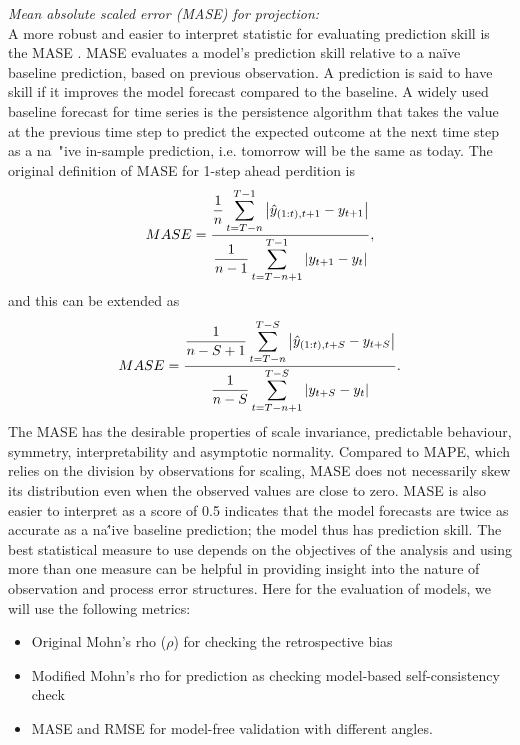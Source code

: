 \vspace{0.2cm} \noindent
{\it Mean absolute scaled error (MASE) for projection:}\\ 
A more robust and easier to interpret statistic for evaluating prediction skill is the MASE \citep{hyndman2006another}. MASE evaluates a model's prediction skill relative to a na\" {i}ve baseline prediction, based on previous observation. A prediction is said to have skill if it improves the model forecast compared to the baseline. A widely used baseline forecast for time series is the persistence algorithm that takes the value at the previous time step to predict the expected outcome at the next time step as a na\ "{i}ve in-sample prediction, i.e. tomorrow will be the same as today. The original definition of MASE for 1-step ahead perdition is 
\begin{equation}
{MASE=\frac{\displaystyle\frac{1}{n} \sum_{t=T-n}^{T-1} \left| \hat{y}_{(1:t),t+1}-y_{t+1} \right|}
{\displaystyle\frac{1}{n-1} \sum_{t=T-n+1}^{T-1} \left|y_{t+1}-y_{t}\right|}}, 
\end{equation}
and this can be extended as 
\begin{equation}
MASE=
\frac{\displaystyle \frac{1}{n-S+1} \sum_{t=T-n}^{T-S}  \left| \hat{y}_{(1:t),t+S}-y_{t+S} \right|}
{\displaystyle \frac{1}{n-S} \sum_{t=T-n+1}^{T-S} \left|y_{t+S}-y_{t}\right|}. 
\end{equation} 
The MASE has the desirable properties of scale invariance, predictable behaviour, symmetry, interpretability and asymptotic normality. Compared to MAPE, which relies on the division by observations for scaling, MASE does not necessarily skew its distribution even when the observed values are close to zero. MASE is also easier to interpret as a score of 0.5 indicates that the model forecasts are twice as accurate as a na\''{i}ve baseline prediction; the model thus has prediction skill.
\vspace{0.2cm} 
The best statistical measure to use depends on the objectives of the analysis and using more than one measure can be helpful in providing insight into the nature of observation and process error structures. Here for the evaluation of models, we will use the following metrics: 

\begin{itemize}
\item Original Mohn's rho ($\rho$) for checking the retrospective bias \\
\vspace{-0.3cm}
\item Modified Mohn's rho for prediction  as checking model-based self-consistency check \\
\vspace{-0.3cm}
\item MASE and RMSE for model-free validation with different angles. 
\end{itemize}
